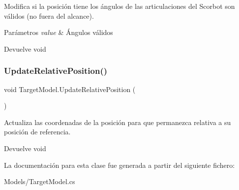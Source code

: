 Modifica si la posición tiene los ángulos de las articulaciones del Scorbot son válidos (no fuera del alcance). 
\begin{DoxyParams}{Parámetros}
{\em value} & Ángulos válidos \\
\hline
\end{DoxyParams}
\begin{DoxyReturn}{Devuelve}
void 
\end{DoxyReturn}
\mbox{\label{class_target_model_a41b6989fae346f10e3d58ccd0587fc83}} 
\subsubsection{\texorpdfstring{UpdateRelativePosition()}{UpdateRelativePosition()}}
{\footnotesize\ttfamily void Target\+Model.\+Update\+Relative\+Position (\begin{DoxyParamCaption}{ }\end{DoxyParamCaption})\hspace{0.3cm}{\ttfamily [inline]}}

Actualiza las coordenadas de la posición para que permanezca relativa a su posición de referencia. \begin{DoxyReturn}{Devuelve}
void 
\end{DoxyReturn}


La documentación para esta clase fue generada a partir del siguiente fichero\+:\begin{DoxyCompactItemize}
\item 
Models/Target\+Model.\+cs\end{DoxyCompactItemize}
